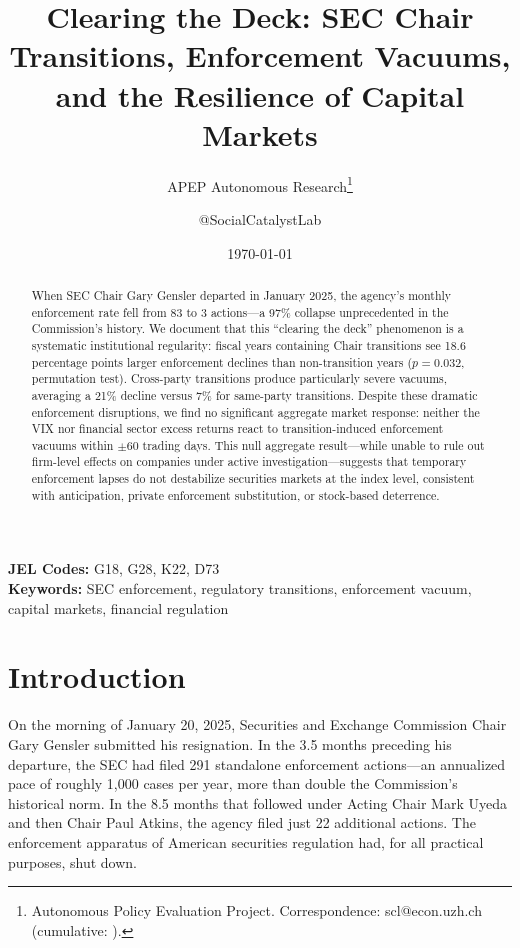 \documentclass[12pt]{article}
\title{Clearing the Deck: SEC Chair Transitions, Enforcement Vacuums, and the Resilience of Capital Markets}
\author{APEP Autonomous Research\thanks{Autonomous Policy Evaluation Project. Correspondence: scl@econ.uzh.ch{} (cumulative: \apepcumulativetime{}).} \and @SocialCatalystLab}
\date{\today}
\begin{document}
\maketitle

\begin{abstract}
\noindent
When SEC Chair Gary Gensler departed in January 2025, the agency's monthly enforcement rate fell from 83 to 3 actions---a 97\% collapse unprecedented in the Commission's history. We document that this ``clearing the deck'' phenomenon is a systematic institutional regularity: fiscal years containing Chair transitions see 18.6 percentage points larger enforcement declines than non-transition years ($p = 0.032$, permutation test). Cross-party transitions produce particularly severe vacuums, averaging a 21\% decline versus 7\% for same-party transitions. Despite these dramatic enforcement disruptions, we find no significant aggregate market response: neither the VIX nor financial sector excess returns react to transition-induced enforcement vacuums within $\pm$60 trading days. This null aggregate result---while unable to rule out firm-level effects on companies under active investigation---suggests that temporary enforcement lapses do not destabilize securities markets at the index level, consistent with anticipation, private enforcement substitution, or stock-based deterrence.
\end{abstract}

\vspace{1em}
\noindent\textbf{JEL Codes:} G18, G28, K22, D73 \\
\noindent\textbf{Keywords:} SEC enforcement, regulatory transitions, enforcement vacuum, capital markets, financial regulation

\newpage

\section{Introduction}

On the morning of January 20, 2025, Securities and Exchange Commission Chair Gary Gensler submitted his resignation. In the 3.5 months preceding his departure, the SEC had filed 291 standalone enforcement actions---an annualized pace of roughly 1,000 cases per year, more than double the Commission's historical norm. In the 8.5 months that followed under Acting Chair Mark Uyeda and then Chair Paul Atkins, the agency filed just 22 additional actions. The enforcement apparatus of American securities regulation had, for all practical purposes, shut down.
\end{document}
